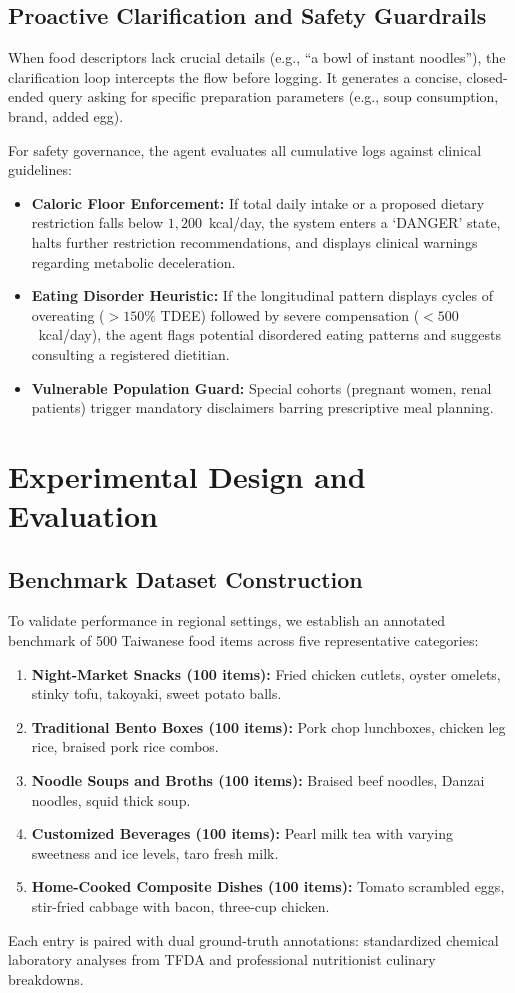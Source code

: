 \documentclass[conference]{IEEEtran}
\begin{document}
\subsection{Proactive Clarification and Safety Guardrails}
When food descriptors lack crucial details (e.g., ``a bowl of instant noodles''), the clarification loop intercepts the flow before logging. It generates a concise, closed-ended query asking for specific preparation parameters (e.g., soup consumption, brand, added egg). 

For safety governance, the agent evaluates all cumulative logs against clinical guidelines:
\begin{itemize}
    \item \textbf{Caloric Floor Enforcement:} If total daily intake or a proposed dietary restriction falls below $1,200$~kcal/day, the system enters a `DANGER' state, halts further restriction recommendations, and displays clinical warnings regarding metabolic deceleration.
    \item \textbf{Eating Disorder Heuristic:} If the longitudinal pattern displays cycles of overeating ($>150\%$ TDEE) followed by severe compensation ($<500$~kcal/day), the agent flags potential disordered eating patterns and suggests consulting a registered dietitian.
    \item \textbf{Vulnerable Population Guard:} Special cohorts (pregnant women, renal patients) trigger mandatory disclaimers barring prescriptive meal planning.
\end{itemize}

\section{Experimental Design and Evaluation}

\subsection{Benchmark Dataset Construction}
To validate performance in regional settings, we establish an annotated benchmark of 500 Taiwanese food items across five representative categories:
\begin{enumerate}
    \item \textbf{Night-Market Snacks (100 items):} Fried chicken cutlets, oyster omelets, stinky tofu, takoyaki, sweet potato balls.
    \item \textbf{Traditional Bento Boxes (100 items):} Pork chop lunchboxes, chicken leg rice, braised pork rice combos.
    \item \textbf{Noodle Soups and Broths (100 items):} Braised beef noodles, Danzai noodles, squid thick soup.
    \item \textbf{Customized Beverages (100 items):} Pearl milk tea with varying sweetness and ice levels, taro fresh milk.
    \item \textbf{Home-Cooked Composite Dishes (100 items):} Tomato scrambled eggs, stir-fried cabbage with bacon, three-cup chicken.
\end{enumerate}
Each entry is paired with dual ground-truth annotations: standardized chemical laboratory analyses from TFDA and professional nutritionist culinary breakdowns.
\end{document}
